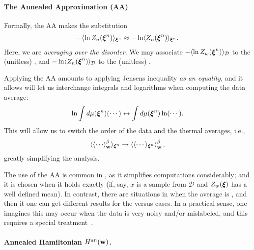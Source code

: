 \paragraph{The Annealed Approximation (AA)} 
Formally, the AA makes the substitution
\begin{align}
\label{eqn:AA}
-\langle\ln Z_{n}(\boldsymbol{\xi}^{n})\rangle_{\boldsymbol{\xi}^{n}}\approx-\ln \langle Z_{n}(\boldsymbol{\xi}^{n})\rangle_{\boldsymbol{\xi}^{n}}.
\end{align}
Here, we are \emph{averaging over the disorder}.
We may associate $-\langle\ln Z_w(\boldsymbol{\xi}^{n})\rangle_{\mathcal{D}}$ to the (unitless) \Quenched \FreeEnergy, and
$-\ln \langle Z_{n}(\boldsymbol{\xi}^{n})\rangle_{\mathcal{D}}$ to the (unitless) \Annealed \FreeEnergy.

Applying the AA amounts to applying Jensens inequality \emph{as an equality}, 
and it allows will let us interchange integrals and logarithms when computing the data average:
\begin{align}
\label{eqn:Jensens}
\ln\int d\mu(\boldsymbol{\xi}^{n})(\cdots)\leftrightarrow \int d\mu(\boldsymbol{\xi}^{n})\ln(\cdots)   .
\end{align}
This will allow us to switch the order of the data and the thermal averages, i.e.,
\begin{align}
 \label{eqn:switch}
\langle\THRMAVGw{\cdots}\rangle_{\NDXIn}\rightarrow\THRMAVGw{\langle\cdots\rangle_{\NDXIn}}   ,
\end{align}
greatly simplifying the analysis.

The use of the AA is common in \STATMECH, as it simplifies computations considerably; and 
it is chosen when it holds exactly (if, say, $x$ is a \Typical sample from $\mathcal{D}$ and $Z_w(\boldsymbol{\xi})$ has a well defined mean).
In contrast, there are situations in \STATMECH when the average is \ATypical, and then it one can get different results for the \Quenched versus \Annealed cases.  In a practical sense, one imagines this may occur when the data is very
noisy and/or mislabeled, and this requires a special treatment~\cite{SST92}.

\paragraph{Annealed Hamiltonian $H^{an}({\mathbf{w}})$.}


